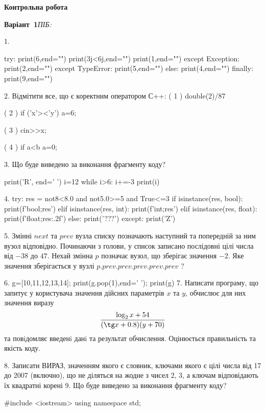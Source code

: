 \documentclass[11pt]{article}
\begin{document}
{\large\textbf{Контрольна робота}}

\textbf{Варіант \No\,1}\hfill \textit{ПІБ:}\,\underline{\hspace{60mm}}
\vspace{4mm}

1. 

try:
    print(6,end="")
    print(3j<6j,end="")
    print(1,end="")
except Exception: print(2,end="")
except TypeError: print(5,end="")
else: print(4,end="")
finally: print(9,end="")

2. %
Відмітити все, що є коректним оператором С++:
( 1 ) double(2)/87

( 2 ) if ('x'><'y') a=6;

( 3 ) cin>>x;

( 4 ) if a<b a=0;

3. Що буде виведено за виконання фрагменту коду?

print('R', end=' ')
i=12
while i>6:
    i+=-3
print(i)


4. 
try:
    res = not8<8.0 and not5.0>=5 and True<=3
    if isinstance(res, bool):
        print(f'bool;{res}')
    elif isinstance(res, int):
        print(f'int;{res}')
    elif isinstance(res, float):
        print(f'float;{res:.2f}')
    else:
        print('???')
except:
    print('Z')

5. 
Змінні $next$ та $prev$ вузла списку позначають наступний та попередній за ним вузол відповідно. Починаючи з голови, у список записано послідовні цілі числа від $-38$ до $47$. Нехай змінна $p$ позначає вузол, що зберігає значення $-2$.
Яке значення зберігається у вузлі $p.prev.prev.prev.prev.prev$ ?

6. 
g=[10,11,12,13,14]; print(g.pop(1),end=' '); print(g)
7. 
Написати програму, що запитує у користувача значення дійсних параметрів $x$ та $y$, обчислює для них значення виразу 
$$\frac{\log_{2} x + 54}{(\tg x + 0.8) (y + 70)}$$ 
та повiдомляє введенi данi та результат обчислення.
 Оцінюється правильність та якість коду.


8. 
Записати ВИРАЗ, значенням якого є словник, ключами якого є цілі числа від 17 до 2007 (включно), що не діляться на жодне з чисел 2, 3, а ключам відповідають їх квадратні корені 
9. Що буде виведено за виконання фрагменту коду?

#include <iostream>
using namespace std;
\end{document}
